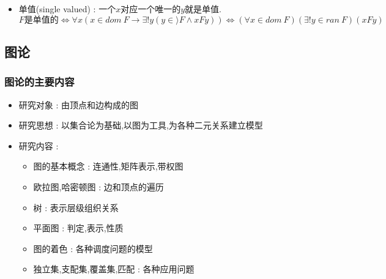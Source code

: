 {{{\begin{itemize}
{\begin{itemize}
{                  $F$是单根的 $\Leftrightarrow \forall y(y \in ran\ F \to \exists! x(x \in dom\ F \land xFy)) \Leftrightarrow (\forall y \in ran\ F)(\exists! x \in dom\ F)(xFy)$

                  \begin{itemize}
                    \item $\exists!$表示"存在唯一的"
                    \item $\forall x (x \in A \to B(x))$缩写为$(\forall x \in A)B(x)$
                    \item $\exists x (x \in A \land B(x))$缩写为$(\exists x \in A)B(x)$
                  \end{itemize}
                  }
            \item {
                  单值(single valued) : 一个$x$对应一个唯一的$y$就是单值.
                  $$
                    \mbox{$F$是单值的} \Leftrightarrow \forall x(x \in dom\ F \to \exists! y (y \in \rangle F \land xFy)) \Leftrightarrow (\forall x \in dom\ F)(\exists! y \in ran\ F)(xFy)
                  $$
                  }
          \end{itemize}
          }
  \end{itemize}
}%

}%

\subsection{图论}{

  \subsubsection{图论的主要内容}{
    \begin{itemize}
      \item 研究对象 : 由顶点和边构成的图
      \item 研究思想 : 以集合论为基础,以图为工具,为各种二元关系建立模型
      \item 研究内容 : \begin{itemize}
              \item 图的基本概念 : 连通性,矩阵表示,带权图
              \item 欧拉图,哈密顿图 : 边和顶点的遍历
              \item 树 : 表示层级组织关系
              \item 平面图 : 判定,表示,性质
              \item 图的着色 : 各种调度问题的模型
              \item 独立集,支配集,覆盖集,匹配 : 各种应用问题
            \end{itemize}
    \end{itemize}
  }%

}}
